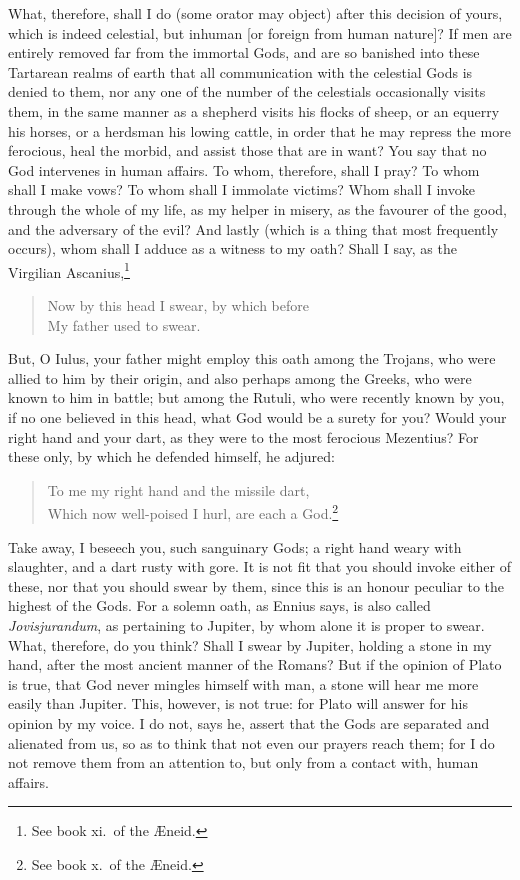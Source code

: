 \documentclass[12pt]{article}
\begin{document}
What, therefore, shall I do (some orator may object) after this decision of
yours, which is indeed celestial, but inhuman [or foreign from human nature]?
If men are entirely removed far from the immortal Gods, and are so banished
into these Tartarean realms of earth that all communication with the celestial
Gods is denied to them, nor any one of the number of the celestials
occasionally visits them, in the same manner as a shepherd visits his flocks of
sheep, or an equerry his horses, or a herdsman his lowing cattle, in order that
he may repress the more ferocious, heal the morbid, and assist those that are
in want? You say that no God intervenes in human affairs. To whom, therefore,
shall I pray? To whom shall I make vows? To whom shall I immolate victims? Whom
shall I invoke through the whole of my life, as my helper in misery, as the
favourer of the good, and the adversary of the evil? And lastly (which is a
thing that most frequently occurs), whom shall I adduce as a witness to my
oath? Shall I say, as the Virgilian Ascanius,\footnote{See book xi.~of the
{\AE}neid.}

\begin{verse}
Now by this head I swear, by which before\\
My father used to swear.
\end{verse}

\noindent But, O Iulus, your father might employ this oath among the Trojans,
who were allied to him by their origin, and also perhaps among the Greeks, who
were known to him in battle; but among the Rutuli, who were recently known by
you, if no one believed in this head, what God would be a surety for you? Would
your right hand and your dart, as they were to the most ferocious Mezentius?
For these only, by which he defended himself, he adjured:

\begin{verse}
To me my right hand and the missile dart,\\
Which now well-poised I hurl, are each a God.\footnote{See book x.~of the
{\AE}neid.}
\end{verse}

\noindent Take away, I beseech you, such sanguinary Gods; a right hand weary
with slaughter, and a dart rusty with gore. It is not fit that you should
invoke either of these, nor that you should swear by them, since this is an
honour peculiar to the highest of the Gods. For a solemn oath, as Ennius says,
is also called \textit{Jovisjurandum}, as pertaining to Jupiter, by whom alone
it is proper to swear. What, therefore, do you think? Shall I swear by Jupiter,
holding a stone in my hand, after the most ancient manner of the Romans? But if
the opinion of Plato is true, that God never mingles himself with man, a stone
will hear me more easily than Jupiter. This, however, is not true: for Plato
will answer for his opinion by my voice. I do not, says he, assert that the
Gods are separated and alienated from us, so as to think that not even our
prayers reach them; for I do not remove them from an attention to, but only
from a contact with, human affairs.
\end{document}
